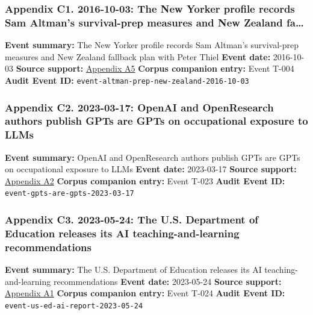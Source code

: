 \documentclass[
  american,
  11pt,
  letterpaper,
]{article}
\begin{document}
\subsubsection{Appendix C1. 2016-10-03: The New Yorker profile records
Sam Altman's survival-prep measures and New Zealand
fa\ldots{}}\label{appendix-c1-2016-10-03-the-new-yorker-profile-records-sam-altman-s-survival-prep-measures-and-new-zealand-fallback-plan-with-peter-thiel}

\textbf{Event summary:} The New Yorker profile records Sam Altman's
survival-prep measures and New Zealand fallback plan with Peter Thiel
\textbf{Event date:} 2016-10-03 \textbf{Source support:}
\hyperref[appendix-a5-sam-altman-s-manifest-destiny]{Appendix A5}
\textbf{Corpus companion entry:} Event T-004 \textbf{Audit Event ID:}
\texttt{event-altman-prep-new-zealand-2016-10-03}

\subsubsection{Appendix C2. 2023-03-17: OpenAI and OpenResearch authors
publish GPTs are GPTs on occupational exposure to
LLMs}\label{appendix-c2-2023-03-17-openai-and-openresearch-authors-publish-gpts-are-gpts-on-occupational-exposure-to-llms}

\textbf{Event summary:} OpenAI and OpenResearch authors publish GPTs are
GPTs on occupational exposure to LLMs \textbf{Event date:} 2023-03-17
\textbf{Source support:}
\hyperref[appendix-a2-gpts-are-gpts-an-early-look-at-the-labor-market-impact-potential-of-large-language-models]{Appendix
A2} \textbf{Corpus companion entry:} Event T-023 \textbf{Audit Event
ID:} \texttt{event-gpts-are-gpts-2023-03-17}

\subsubsection{Appendix C3. 2023-05-24: The U.S. Department of Education
releases its AI teaching-and-learning
recommendations}\label{appendix-c3-2023-05-24-the-u-s-department-of-education-releases-its-ai-teaching-and-learning-recommendations}

\textbf{Event summary:} The U.S. Department of Education releases its AI
teaching-and-learning recommendations \textbf{Event date:} 2023-05-24
\textbf{Source support:}
\hyperref[appendix-a1-artificial-intelligence-and-the-future-of-teaching-and-learning-insights-and-recommendations]{Appendix
A1} \textbf{Corpus companion entry:} Event T-024 \textbf{Audit Event
ID:} \texttt{event-us-ed-ai-report-2023-05-24}
\end{document}
